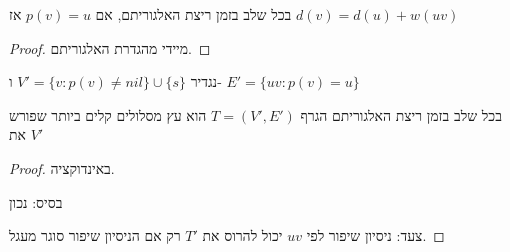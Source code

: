 \begin{claim}
בכל שלב בזמן ריצת האלגוריתם, אם
$p(v) = u$
אז 
$d(v) = d(u) + w(uv)$
\end{claim}
\begin{proof}
מיידי מהגדרת האלגוריתם.
\end{proof}



נגדיר
$V' = \{v : p(v) \neq nil\} \cup \{s\}$
ו-%
$E' = \{uv : p(v) = u\}$
\begin{claim}
בכל שלב בזמן ריצת האלגוריתם הגרף 
$T = (V', E')$
הוא עץ מסלולים קלים ביותר שפורש את 
$V'$
\end{claim}
\begin{proof}
באינדוקציה.

בסיס: נכון

צעד: ניסיון שיפור לפי $uv$ יכול להרוס את 
$T'$
רק אם הניסיון שיפור סוגר מעגל.
\end{proof}
